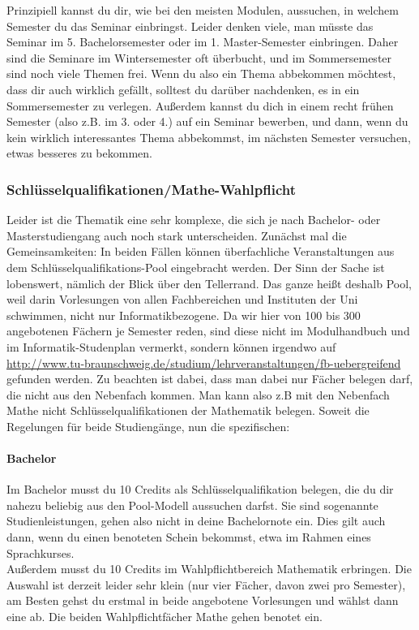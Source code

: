 Prinzipiell kannst du dir, wie bei den meisten Modulen, aussuchen, in welchem Semester du das Seminar einbringst. Leider denken viele, man müsste das Seminar im 5. Bachelorsemester oder im 1. Master-Semester einbringen. Daher sind die Seminare im Wintersemester oft überbucht, und im Sommersemester sind noch viele Themen frei. Wenn du also ein Thema abbekommen möchtest, dass dir auch wirklich gefällt, solltest du darüber nachdenken, es in ein Sommersemester zu verlegen. Außerdem kannst du dich in einem recht frühen Semester (also z.B. im 3. oder 4.) auf ein Seminar bewerben, und dann, wenn du kein wirklich interessantes Thema abbekommst, im nächsten Semester versuchen, etwas besseres zu bekommen.

\subsubsection{Schlüsselqualifikationen/Mathe-Wahl\-pflicht}
Leider ist die Thematik eine sehr komplexe, die sich je nach Bachelor-
oder Masterstudiengang auch noch stark unterscheiden. Zunächst mal
die Gemeinsamkeiten: In beiden Fällen können überfachliche
Veranstaltungen aus dem Schlüsselqualifikations-Pool eingebracht
werden. Der Sinn der Sache ist lobenswert, nämlich der Blick über den
Tellerrand.  Das ganze heißt deshalb Pool, weil darin
Vorlesungen von allen Fachbereichen und Instituten der Uni schwimmen,
nicht nur Informatikbezogene. Da wir hier von 100 bis 300 angebotenen
Fächern je Semester reden, sind diese nicht im Modulhandbuch und im
Informatik-Studenplan vermerkt, sondern können irgendwo auf
\url{http://www.tu-braunschweig.de/studium/lehrveranstaltungen/fb-uebergreifend}
gefunden werden.   Zu beachten ist dabei, dass man dabei
nur Fächer belegen darf, die nicht aus den Nebenfach kommen. Man kann
also z.B mit den Nebenfach Mathe nicht Schlüsselqualifikationen der
Mathematik belegen. 
Soweit die Regelungen für beide Studiengänge, nun die spezifischen:

\paragraph*{Bachelor}
Im Bachelor musst du 10 Credits als Schlüsselqualifikation belegen,
die du dir nahezu beliebig aus den Pool-Modell aussuchen darfst. Sie
sind sogenannte Studienleistungen, gehen also nicht in deine
Bachelornote ein. Dies gilt auch dann, wenn du einen benoteten Schein
bekommst, etwa im Rahmen eines Sprachkurses.\\
Außerdem musst du 10 Credits im Wahlpflichtbereich Mathematik
erbringen. Die Auswahl ist derzeit leider sehr klein (nur vier
Fächer, davon zwei pro Semester), am Besten gehst du erstmal in beide
angebotene Vorlesungen und wählst dann eine ab. Die beiden
Wahlpflichtfächer Mathe gehen benotet ein.

